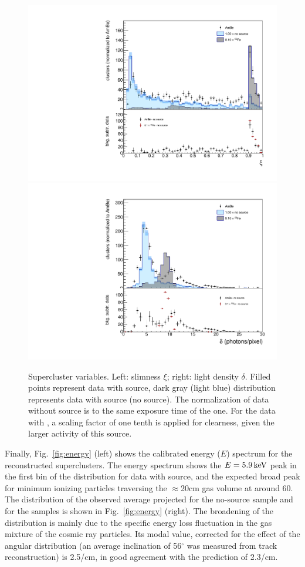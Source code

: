 \begin{figure}[ht]
  \begin{center}
  \includegraphics[width=0.45\linewidth]{figures/slimness}
  \includegraphics[width=0.45\linewidth]{figures/density}

  \caption{Supercluster variables. Left: slimness $\xi$; right: light
    density $\delta$. Filled points represent data with \ambe source,
    dark gray (light blue) distribution represents data with \fe
    source (no source).  The normalization of data without source is
    to the same exposure time of the \ambe one. For the data with \fe,
    a scaling factor of one tenth is applied for clearness, given the
    larger activity of this source. \label{fig:clshape}}

\end{center}
\end{figure}

Finally, Fig.~\ref{fig:energy} (left) shows the calibrated energy
($E$) spectrum for the reconstructed superclusters. The energy
spectrum shows the $E=5.9\,\textrm{ke\hspace{-.08em}V}$ peak in the first bin of the
distribution for data with \fe source, and the expected broad peak for
minimum ionizing particles traversing the $\approx$20\unit{cm} gas
volume at around 60\keV. The distribution of the observed average
projected \dedl for the no-source sample and for the \ambe samples is
shown in Fig.~\ref{fig:energy} (right). The broadening of the
distribution is mainly due to the specific energy loss fluctuation in
the gas mixture of the cosmic ray particles.  Its modal value,
corrected for the effect of the angular distribution (an average
inclination of 56$^{\circ}$ was measured from track reconstruction) is
2.5\keV/cm, in good agreement with the \garfield prediction of
2.3\keV/cm.


